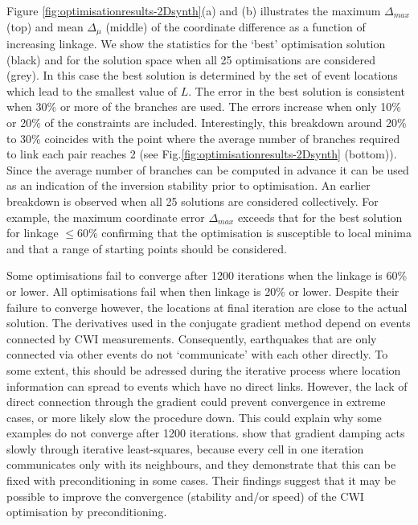 \documentclass[extra]{gji}
\begin{document}
Figure \ref{fig:optimisationresults-2Dsynth}(a) and (b) illustrates 
the maximum $\Delta_{max}$ (top) and mean $\Delta_\mu$ (middle) of the
coordinate difference as a function of increasing linkage. We show
the statistics for the `best' optimisation solution (black) and for
the solution space when all 25 optimisations are considered (grey).
In this case the best solution is determined by the set of event
locations which lead to the smallest value of $L$. The
error in the best solution is consistent when 30\%
or more of the branches are used. The errors increase when only
10\% or 20\% of the constraints are included. Interestingly, this
breakdown around 20\% to 30\% coincides with the point where the
average number of branches required to link each pair reaches 2 (see
Fig.\ref{fig:optimisationresults-2Dsynth} (bottom)). Since the average
number of branches can be computed in advance it can be used as an
indication of the inversion stability prior to
optimisation. An earlier breakdown is observed when all 25 solutions
are considered collectively. For example, the maximum coordinate
error $\Delta_{max}$ exceeds that for the best
solution for linkage $\leq$60\% confirming that the optimisation is susceptible to
local minima and that a range of starting points should
be considered.

Some optimisations 
fail to converge after 1200 iterations when the linkage is 60\% or lower. All optimisations
fail when then linkage is 20\% or lower. Despite their failure to converge however, the locations
at final iteration are close to the actual solution. The derivatives used in the conjugate gradient method
depend on events connected by CWI measurements. Consequently,
earthquakes that are only connected via other events do not `communicate' with each other
directly. To some extent, this should be adressed during the iterative process where location information
can spread to events which have no direct links. However, the
lack of direct connection through the gradient could prevent convergence in extreme cases, or more likely
slow the procedure down. This could explain why some
examples do not converge after 1200 iterations.
\citet{dr_VanDecar94a} show that gradient damping acts
slowly through iterative least-squares, because
 every cell in one iteration communicates only with its neighbours, and they demonstrate that this can be
fixed with preconditioning in some cases. Their findings suggest that it may be possible to improve
the convergence (stability and/or speed) of the CWI optimisation by preconditioning.
\end{document}
